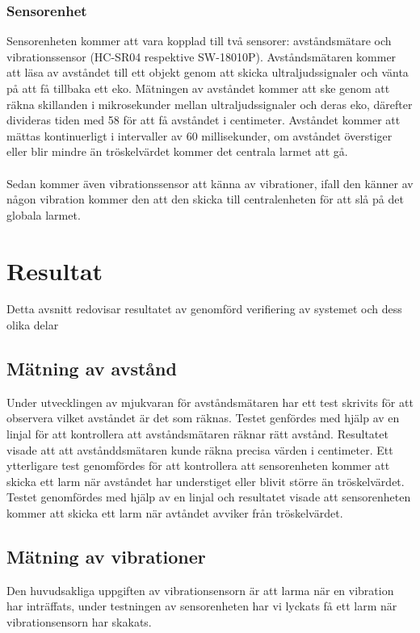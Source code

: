 \documentclass{article}
\begin{document}
\subsubsection{Sensorenhet}

Sensorenheten kommer att vara kopplad till två sensorer: avståndsmätare och vibrationssensor (HC-SR04 respektive SW-18010P).
Avståndsmätaren kommer att läsa av avståndet till ett objekt genom att skicka ultraljudssignaler och vänta på att få tillbaka ett eko. 
Mätningen av avståndet kommer att ske genom att räkna skillanden i mikrosekunder mellan ultraljudssignaler och deras eko, därefter divideras tiden med 58 för att få avståndet i centimeter. 
Avståndet kommer att mättas kontinuerligt i intervaller av 60 millisekunder, om avståndet överstiger eller blir mindre än tröskelvärdet kommer det centrala larmet att gå.\\
\\
Sedan kommer även vibrationssensor att känna av vibrationer, ifall den känner av någon vibration kommer den att den skicka till centralenheten för att slå på det globala larmet.



\section{Resultat}
Detta avsnitt redovisar resultatet av genomförd verifiering av systemet och dess olika delar

\subsection{Mätning av avstånd}
Under utvecklingen av mjukvaran för avståndsmätaren har ett test skrivits för att observera vilket avståndet är det som räknas. Testet genfördes med hjälp av en linjal för att kontrollera att avståndsmätaren räknar rätt avstånd. Resultatet visade att att avstånddsmätaren kunde räkna precisa värden i centimeter. Ett ytterligare test genomfördes för att kontrollera att sensorenheten kommer att skicka ett larm när avståndet har understiget eller blivit större än tröskelvärdet. Testet genomfördes med hjälp av en linjal och resultatet visade att sensorenheten kommer att skicka ett larm när avtåndet avviker från tröskelvärdet. 

\subsection{Mätning av vibrationer}
Den huvudsakliga uppgiften av vibrationsensorn är att larma när en vibration har inträffats, under testningen av sensorenheten har vi lyckats få ett larm när vibrationsensorn har skakats.
\end{document}
